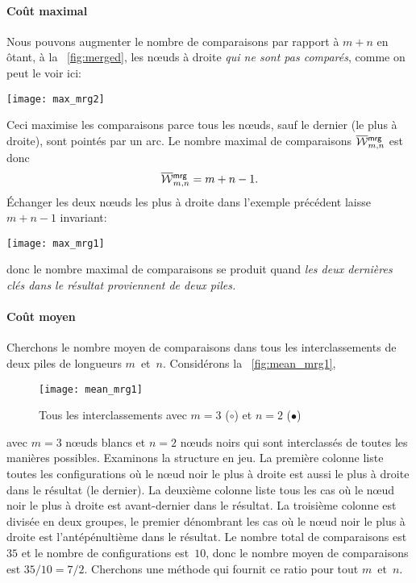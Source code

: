 \paragraph{Coût maximal}

Nous pouvons augmenter le nombre de comparaisons par rapport à \(m+n\)
en ôtant, à la \fig~\vref{fig:merged}, les n{\oe}uds à droite
\emph{qui ne sont pas comparés}, comme on peut le voir ici:
\begin{center}
\texttt{[image: max\_mrg2]}
\end{center}
Ceci maximise les comparaisons parce tous les n{\oe}uds, sauf le
dernier (le plus à droite), sont pointés par un arc. Le nombre maximal
de comparaisons
\(\OW{\fun{mrg}}{m,n}\) est donc
\begin{equation}
\OW{\fun{mrg}}{m,n} = m + n - 1.\label{eq:worst_merge}
\end{equation}
Échanger les deux n{\oe}uds les plus à droite dans l'exemple précédent
laisse \(m+n-1\) invariant:
\begin{center}
\texttt{[image: max\_mrg1]}
\end{center}
donc le nombre maximal de comparaisons se produit quand \emph{les deux
  dernières clés dans le résultat proviennent de deux piles.}


\paragraph{Coût moyen}

Cherchons le nombre moyen de comparaisons dans tous les
interclassements de deux piles de longueurs
\(m\)~et~\(n\). Considérons la \fig~\vref{fig:mean_mrg1},
\begin{figure}[b]
\centering
\texttt{[image: mean\_mrg1]}
\caption{Tous les interclassements avec \(m=3\) (\(\circ\)) et \(n=2\)
  (\(\bullet\))}
\label{fig:mean_mrg1}
\end{figure}
avec \(m=3\) n{\oe}uds blancs et \(n=2\) n{\oe}uds noirs qui sont
interclassés de toutes les manières possibles. Examinons la structure
en jeu. La première colonne liste toutes les configurations où le
n{\oe}ud noir le plus à droite est aussi le plus à droite dans le
résultat (le dernier). La deuxième colonne liste tous les cas où le
n{\oe}ud noir le plus à droite est avant-dernier dans le résultat. La
troisième colonne est divisée en deux groupes, le premier dénombrant
les cas où le n{\oe}ud noir le plus à droite est l'antépénultième dans
le résultat. Le nombre total de comparaisons est~\(35\) et le nombre
de configurations est~\(10\), donc le nombre moyen de comparaisons est
\(35/10 = 7/2\).\label{seven_two} Cherchons une méthode qui fournit ce
ratio pour tout \(m\)~et~\(n\).

